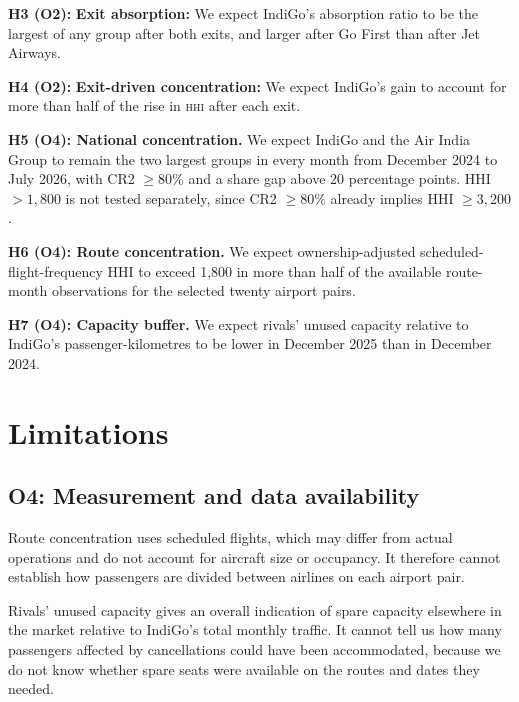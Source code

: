 \documentclass[12pt,a4paper]{article}
\newenvironment{authorcontribution}[1]{\par\begingroup\color{#1}}{\par\endgroup}
\newcommand{\HHI}{\textsc{hhi}}
\begin{document}
\begin{authorcontribution}{authorMeena}
\textbf{H3 (O2):} \textbf{Exit absorption:} We expect IndiGo's absorption ratio to be the largest of any group after both exits, and larger after Go First than after Jet Airways.

\textbf{H4 (O2):} \textbf{Exit-driven concentration:} We expect IndiGo's gain to account for more than half of the rise in \HHI{} after each exit.
\end{authorcontribution}

\begin{authorcontribution}{authorGoutham}
\textbf{H5 (O4): National concentration.} We expect IndiGo and the Air India Group to remain the two largest groups in every month from December 2024 to July 2026, with CR2 $\geq80\%$ and a share gap above 20 percentage points. HHI $>1{,}800$ is not tested separately, since CR2 $\geq80\%$ already implies HHI $\geq3{,}200$.

\textbf{H6 (O4): Route concentration.} We expect ownership-adjusted scheduled-flight-frequency HHI to exceed 1,800 in more than half of the available route-month observations for the selected twenty airport pairs.

\textbf{H7 (O4): Capacity buffer.} We expect rivals' unused capacity relative to IndiGo's passenger-kilometres to be lower in December 2025 than in December 2024.
\end{authorcontribution}
\endgroup

\clearpage

\clearpage

\clearpage

\clearpage

\clearpage
\section{Limitations}
\subsection{O4: Measurement and data availability}
Route concentration uses scheduled flights, which may differ from actual operations and do not account for aircraft size or occupancy. It therefore cannot establish how passengers are divided between airlines on each airport pair.

Rivals' unused capacity gives an overall indication of spare capacity elsewhere in the market relative to IndiGo's total monthly traffic. It cannot tell us how many passengers affected by cancellations could have been accommodated, because we do not know whether spare seats were available on the routes and dates they needed.
\end{document}
